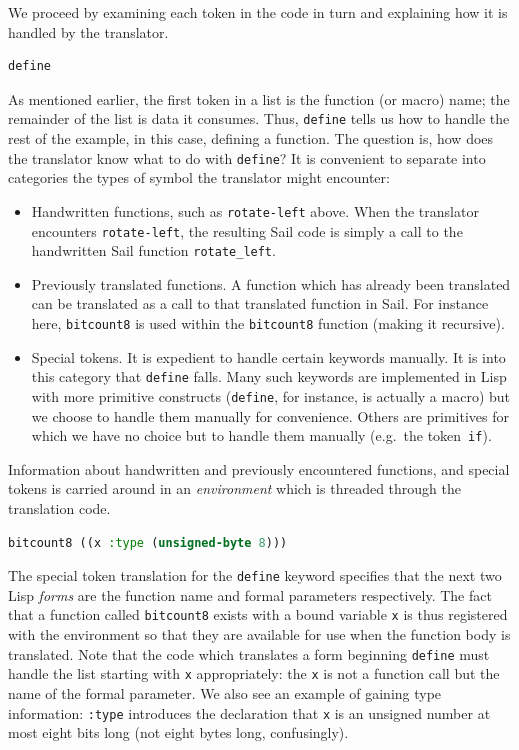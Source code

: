 \documentclass[a4paper,12pt,twoside,openright]{report}
\begin{document}
We proceed by examining each token in the code in turn and explaining how it is handled by the translator.

\bigskip
\begin{lstlisting}[language=lisp]
define
\end{lstlisting}

As mentioned earlier, the first token in a list is the function (or macro) name; the remainder of the list is data it consumes.  Thus, \texttt{define} tells us how to handle the rest of the example, in this case, defining a function.  The question is, how does the translator know what to do with \texttt{define}?  It is convenient to separate into categories the types of symbol the translator might encounter:

\begin{itemize}
	\item Handwritten functions, such as \texttt{rotate-left} above.  When the translator encounters \texttt{rotate-left}, the resulting Sail code is simply a call to the handwritten Sail function \texttt{rotate\_left}.
	\item Previously translated functions.  A function which has already been translated can be translated as a call to that translated function in Sail.  For instance here, \texttt{bitcount8} is used within the \texttt{bitcount8} function (making it recursive).
	\item Special tokens.  It is expedient to handle certain keywords manually.  It is into this category that \texttt{define} falls.  Many such keywords are implemented in Lisp with more primitive constructs (\texttt{define}, for instance, is actually a macro) but we choose to handle them manually for convenience.  Others are primitives for which we have no choice but to handle them manually (e.g.~the token~\texttt{if}).
\end{itemize}

Information about handwritten and previously encountered functions, and special tokens is carried around in an \emph{environment} which is threaded through the translation code.

\bigskip
\begin{lstlisting}[language=lisp]
bitcount8 ((x :type (unsigned-byte 8)))
\end{lstlisting}

The special token translation for the \texttt{define} keyword specifies that the next two Lisp \emph{forms} are the function name and formal parameters respectively.  The fact that a function called \texttt{bitcount8} exists with a bound variable \texttt{x} is thus registered with the environment so that they are available for use when the function body is translated.  Note that the code which translates a form beginning \texttt{define} must handle the list starting with \texttt{x} appropriately: the \texttt{x} is not a function call but the name of the formal parameter.  We also see an example of gaining type information: \texttt{:type} introduces the declaration that \texttt{x} is an unsigned number at most eight bits long (not eight bytes long, confusingly).
\end{document}
